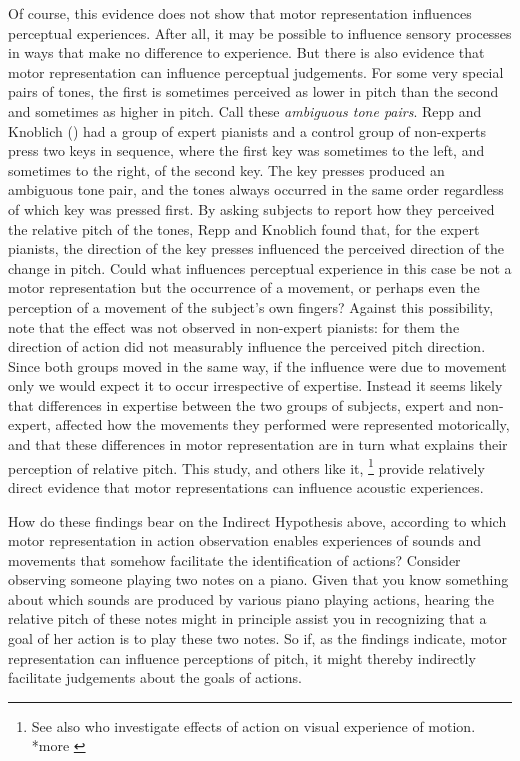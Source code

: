 \documentclass[12pt,\papersize]{extarticle}
\begin{document}
Of course, this evidence does not show that motor representation influences perceptual experiences.  After all, it may be possible to influence sensory processes in ways that make no difference to experience.  But there is also evidence that motor representation can influence perceptual judgements.  For some very special pairs of tones, the first is sometimes perceived as lower in pitch than the second and sometimes as higher in pitch.  Call these \emph{ambiguous tone pairs}.  Repp and Knoblich (\citeyear{repp:2007_action}) had a group of expert pianists and a control group of non-experts press two keys in sequence, where the first key was sometimes to the left, and sometimes to the right, of the second key.  The key presses produced an ambiguous tone pair, and the tones always occurred in the same order regardless of which key was pressed first.  By asking subjects to report how they perceived the relative pitch of the tones, Repp and Knoblich found that, for the expert pianists, the direction of the key presses influenced the perceived direction of the change in pitch. Could what influences perceptual experience in this case be not a motor representation but the occurrence of a movement, or perhaps even the perception of a movement of the subject's own fingers? Against this possibility, note that the effect was not observed in non-expert pianists: for them the direction of action did not measurably influence the perceived pitch direction. Since both groups moved in the same way, if the influence were due to movement only we would expect it to occur irrespective of expertise. Instead it seems likely that differences in expertise between the two groups of subjects, expert and non-expert, affected how the movements they performed were represented motorically, and that these differences in motor representation are in turn what explains their perception of relative pitch.  This study, and others like it,%
\footnote{
See also \citet{zwickel:2010_interference} who investigate effects of action on visual experience of motion.  *more \citep{schutz-bosbach:2007_perceptual}
} 
provide relatively direct evidence that motor representations can influence acoustic experiences.

How do these findings bear on the Indirect Hypothesis above, according to which motor representation in action observation enables experiences of sounds and movements that somehow facilitate the identification of actions?  Consider observing someone playing two notes on a piano.  Given that you know something about which sounds are produced by various piano playing actions, hearing the relative pitch of these notes might in principle assist you in recognizing that a goal of her action is to play these two notes.  So if, as the findings indicate, motor representation can influence perceptions of pitch, it might thereby indirectly facilitate judgements about the goals of actions.  
\end{document}

